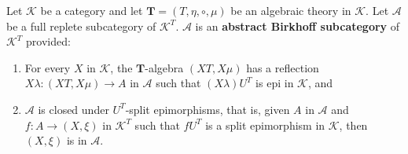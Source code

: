 Let $\mathcal{K}$ be a category and let $\mathbf{T} = (T, \eta, \circ, \mu)$ be an algebraic theory in $\mathcal{K}$. Let $\mathcal{A}$ be a full replete subcategory of $\mathcal{K}^T$. $\mathcal{A}$ is an \textbf{abstract Birkhoff subcategory} of $\mathcal{K}^T$ provided:

\begin{enumerate}
\item For every $X$ in $\mathcal{K}$, the $\mathbf{T}$-algebra $(XT, X\mu)$ has a reflection $X\lambda: (XT, X\mu) \longrightarrow A$ in $\mathcal{A}$ such that $(X\lambda)U^T$ is epi in $\mathcal{K}$, and
\item $\mathcal{A}$ is closed under $U^T$-split epimorphisms, that is, given $A$ in $\mathcal{A}$ and $f: A \longrightarrow (X, \xi)$ in $\mathcal{K}^T$ such that $fU^T$ is a split epimorphism in $\mathcal{K}$, then $(X, \xi)$ is in $\mathcal{A}$.
\end{enumerate}
